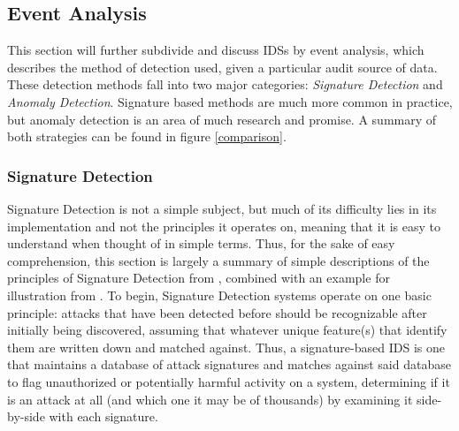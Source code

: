 \documentclass{acm_proc_article-sp}
\begin{document}
    \subsection{Event Analysis}
   		This section will further subdivide and discuss IDSs by event analysis, which describes the method of detection used, given a particular audit source of data. These detection methods fall into two major categories: \emph{Signature Detection} and \emph{Anomaly Detection}. Signature based methods are much more common in practice, but anomaly detection is an area of much research and promise. A summary of both strategies can be found in figure \ref{comparison}.
	    \subsubsection{Signature Detection} 
	    	Signature Detection is not a simple subject, but much of its difficulty lies in its implementation and not the principles it operates on, meaning that it is easy to understand when thought of in simple terms. Thus, for the sake of easy comprehension, this section is largely a summary of simple descriptions of the principles of Signature Detection from \cite{Taylor2006}, combined with an example for illustration from \cite{Labs1999}. To begin, Signature Detection systems operate on one basic principle: attacks that have been detected before should be recognizable after initially being discovered, assuming that whatever unique feature(s) that identify them are written down and matched against. Thus, a signature-based IDS is one that maintains a database of attack signatures and matches against said database to flag unauthorized or potentially harmful activity on a system, determining if it is an attack at all (and which one it may be of thousands) by examining it side-by-side with each signature. 
	    	
\end{document}
